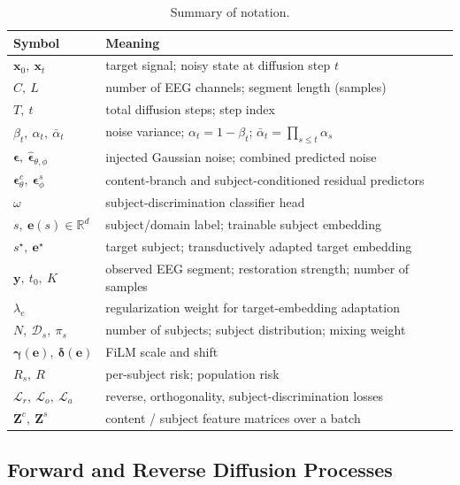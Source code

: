 \begin{table}[t]
  \caption{Summary of notation.}
  \label{tab:notation}
  \small
  \begin{tabular}{ll}
    \toprule
    Symbol & Meaning \\
    \midrule
    $\mathbf{x}_0,\ \mathbf{x}_t$ & target signal; noisy state at diffusion step $t$ \\
    $C,\ L$ & number of EEG channels; segment length (samples) \\
    $T,\ t$ & total diffusion steps; step index \\
    $\beta_t,\ \alpha_t,\ \bar{\alpha}_t$ & noise variance; $\alpha_t{=}1{-}\beta_t$; $\bar{\alpha}_t{=}\textstyle\prod_{s\le t}\alpha_s$ \\
    $\boldsymbol{\epsilon},\ \widehat{\boldsymbol{\epsilon}}_{\theta,\phi}$ & injected Gaussian noise; combined predicted noise \\
    $\boldsymbol{\epsilon}^{c}_{\theta},\ \boldsymbol{\epsilon}^{s}_{\phi}$ & content-branch and subject-conditioned residual predictors \\
    $\omega$ & subject-discrimination classifier head \\
    $s,\ \mathbf{e}(s)\in\mathbb{R}^{d}$ & subject/domain label; trainable subject embedding \\
    $s^\star,\ \mathbf{e}^\star$ & target subject; transductively adapted target embedding \\
    $\mathbf{y},\ t_0,\ K$ & observed EEG segment; restoration strength; number of samples \\
    $\lambda_e$ & regularization weight for target-embedding adaptation \\
    $N,\ \mathcal{D}_s,\ \pi_s$ & number of subjects; subject distribution; mixing weight \\
    $\boldsymbol{\gamma}(\mathbf{e}),\ \boldsymbol{\delta}(\mathbf{e})$ & FiLM scale and shift \\
    $R_s,\ R$ & per-subject risk; population risk \\
    $\mathcal{L}_r,\ \mathcal{L}_o,\ \mathcal{L}_a$ & reverse, orthogonality, subject-discrimination losses \\
    $\mathbf{Z}^{c},\ \mathbf{Z}^{s}$ & content / subject feature matrices over a batch \\
    \bottomrule
  \end{tabular}
\end{table}

\subsection{Forward and Reverse Diffusion Processes}
\label{sec:method_diffusion}

